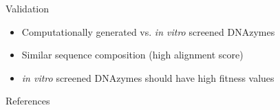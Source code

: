 \documentclass[aspectratio=43]{beamer}
\begin{document}
\begin{frame}[fragile]{Validation}
\begin{figure}[htb!]
\end{figure}
\begin{itemize}
    \item<2-> Computationally generated vs. \textit{in vitro} screened DNAzymes
    \item<3-> Similar sequence composition (high alignment score)
    \item<4-> \textit{in vitro} screened DNAzymes should have high fitness values
\end{itemize}
\end{frame}

\begin{frame}[allowframebreaks]{References}
    \printbibliography
\end{frame}
\end{document}
